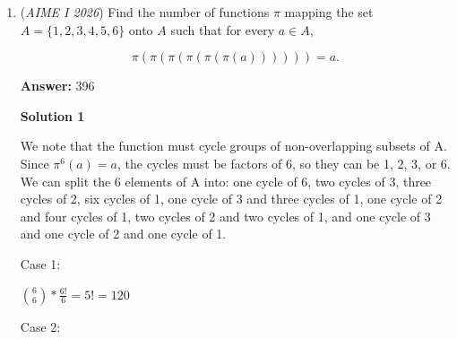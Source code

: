 \begin{enumerate}
 Thus we have $P = 2026^{20}$, whose prime factorization is $P = 1013^{20} \cdot 2^{20}$. The number of factors of a number with prime factorization $p_1^{e_1} \cdot p_2^{e_2} \cdot \ldots \cdot p_n^{e_n}$ is determined by $(e_1+1)(e_2+1)\ldots(e_n+1)$. Thus, the number of factors of $P$ is just $(20+1)(20+1) = 21^2 = \boxed{441}$.

 



\textbf{Solution 6}

Let $y=\log_{2026}x$. Raise both sides to the $20$th power and take log base $2026$ of both sides.

 
 \[\log_{2026}(x^{\log_{2026}x}) = \log_{2026}(26x)^{20}\]By the power rule of logarithms we have
 \[\log_{2026}x \cdot \log_{2026}x = 20(\log_{2026}(26 \cdot x))\]By the product rule of logarithms,
 \[\log_{2026}x \cdot \log_{2026}x = 20\log_{2026}26 + 20\log_{2026}x\]Plugging in $y$ we have
 \[y^2 = 20y + 20\log_{2026}26\]
 \[y^2 - 20y - 20\log_{2026}26 = 0\]Let's say the roots of this equation are $y_1$ and $y_2$, then the product of the values of $x$ is
 \[2026^{y_1} \cdot 2026^{y_2} = 2026^{y_1 + y_2}\]By Vieta's we know that $y_1+y_2$ is just 20, so the product of the values of $x$ is $2026^{20}$
 \[2026^{20} = 2^{20} \cdot 1013^{20}\]So the number of factors of $2026^{20} (P)$ is $(20 + 1)(20 + 1) = 21^2 = \boxed{441}$.

 


	\item (\textit{AIME I 2026}) Find the number of functions $\pi$ mapping the set $A=\{1,2,3,4,5,6\}$ onto $A$ such that for every $a\in A$, 

 \[\pi(\pi(\pi(\pi(\pi(\pi(a))))))=a.\]

 \textbf{Answer: }396



\textbf{Solution 1}

We note that the function must cycle groups of non-overlapping subsets of A. Since $\pi^6(a)=a$, the cycles must be factors of 6, so they can be 1, 2, 3, or 6. We can split the 6 elements of A into: one cycle of 6, two cycles of 3, three cycles of 2, six cycles of 1, one cycle of 3 and three cycles of 1, one cycle of 2 and four cycles of 1, two cycles of 2 and two cycles of 1, and one cycle of 3 and one cycle of 2 and one cycle of 1.

 Case 1:

 $\binom{6}{6}*\frac{6!}{6}=5!=120$

 Case 2:


\end{enumerate}
